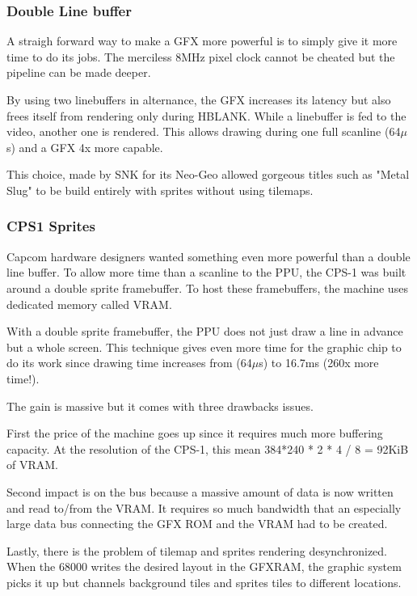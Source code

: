 \subsubsection{Double Line buffer}
A straigh forward way to make a GFX more powerful is to simply give it more time to do its jobs. The merciless 8MHz pixel clock cannot be cheated but the pipeline can be made deeper.

By using two linebuffers in alternance, the GFX increases its latency but also frees itself from rendering only during HBLANK. While a linebuffer is fed to the video, another one is rendered. This allows drawing during one full scanline (64$\mu$s) and a GFX 4x more capable. 

This choice, made by SNK for its Neo-Geo allowed gorgeous titles such as "Metal Slug" to be build entirely with sprites without using tilemaps.




\subsubsection{CPS1 Sprites}
Capcom hardware designers wanted something even more powerful than a double line buffer. To allow more time than a scanline to the PPU, the CPS-1 was built around a double sprite framebuffer. To host these framebuffers, the machine uses dedicated memory called VRAM.

With a double sprite framebuffer, the PPU does not just draw a line in advance but a whole screen. This technique gives even more time for the graphic chip to do its work since drawing time increases from (64$\mu$s) to 16.7ms (260x more time!). 

The gain is massive but it comes with three drawbacks issues. 

First the price of the machine goes up since it requires much more buffering capacity. At the resolution of the CPS-1, this mean 384*240 * 2 * 4 / 8 = 92KiB of VRAM.


Second impact is on the bus because a massive amount of data is now written and read to/from the VRAM. It requires so much bandwidth that an especially large data bus connecting the GFX ROM and the VRAM had to be created.

Lastly, there is the problem of tilemap and sprites rendering desynchronized. When the 68000 writes the desired layout in the GFXRAM, the graphic system picks it up but channels background tiles and sprites tiles to different locations.

